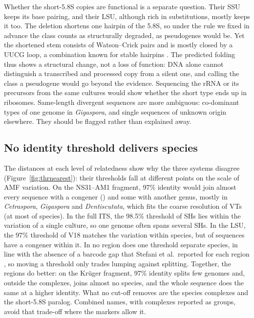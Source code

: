 \documentclass[11pt]{article}
\newcommand{\spn}[1]{\emph{#1}}   %
\begin{document}
Whether the short-5.8S copies are functional is a separate question. Their SSU keeps its base pairing, and their LSU,
although rich in substitutions, mostly keeps it too. The deletion shortens one hairpin of the 5.8S, so under the rule
we fixed in advance the class counts as structurally degraded, as pseudogenes would be. Yet the shortened stem
consists of Watson--Crick pairs and is mostly closed by a UUCG loop, a combination known for stable hairpins
\cite{tuerk1988cuucgg}. The predicted folding thus shows a structural change, not a loss of function: DNA alone cannot
distinguish a transcribed and processed copy from a silent one, and calling the class a pseudogene would go beyond
the evidence. Sequencing the rRNA or its precursors from the same cultures would show whether the short type ends up
in ribosomes. Same-length divergent sequences are more ambiguous: co-dominant types of one genome in \spn{Gigaspora},
and single sequences of unknown origin elsewhere. They should be flagged rather than explained away.

\subsection{No identity threshold delivers species}
The distances at each level of relatedness show why the three systems disagree (Figure~\ref{fig:thrnearest}): their
thresholds fall at different points on the scale of AMF variation. On the NS31--AM1 fragment, 97\% identity would join
almost every sequence with a congener (\ThrVTCongenerDB{}) and some with another genus, mostly in \spn{Cetraspora},
\spn{Gigaspora} and \spn{Dentiscutata}, which fits the coarse resolution of VTs (at most \VTResolvedZero{} of
\NSpecies{} species). In the full ITS, the 98.5\% threshold of SHs lies within the variation of a single culture, so
one genome often spans several SHs. In the LSU, the 97\% threshold of V18 matches the variation within species, but
\ThrLSUCongener{} of sequences have a congener within it. In no region does one threshold separate species, in line
with the absence of a barcode gap that Stefani et al.\ reported for each region \cite{stefani2025rdna}, so moving a
threshold only trades lumping against splitting. Together, the regions do better: on the Kr\"uger fragment, 97\%
identity splits few genomes and, outside the complexes, joins almost no species, and the whole sequence does the same
at a higher identity. What no cut-off removes are the species complexes and the short-5.8S paralog. Combined names,
with complexes reported as groups, avoid that trade-off where the markers allow it.
\end{document}

